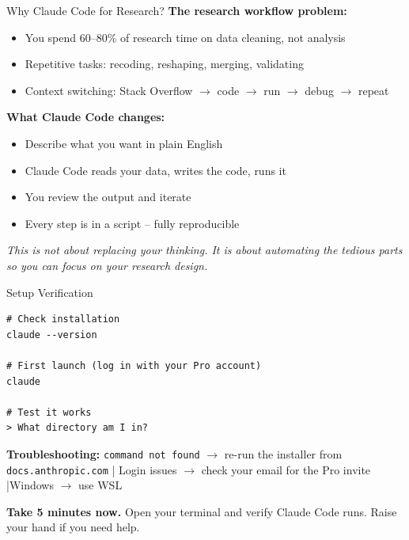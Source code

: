 \begin{frame}{Why Claude Code for Research?}
  \textbf{The research workflow problem:}

  \begin{itemize}
    \item You spend 60--80\% of research time on data cleaning, not analysis
    \item Repetitive tasks: recoding, reshaping, merging, validating
    \item Context switching: Stack Overflow $\to$ code $\to$ run $\to$ debug $\to$ repeat
  \end{itemize}

  \vspace{10pt}

  \textbf{What Claude Code changes:}

  \begin{itemize}
    \item Describe what you want in plain English
    \item Claude Code reads your data, writes the code, runs it
    \item You review the output and iterate
    \item Every step is in a script -- fully reproducible
  \end{itemize}

  \vspace{8pt}

  \textit{This is not about replacing your thinking. It is about automating the tedious parts so you can focus on your research design.}
\end{frame}

\begin{frame}[fragile]{Setup Verification}
\begin{lstlisting}[style=terminal]
# Check installation
claude --version

# First launch (log in with your Pro account)
claude

# Test it works
> What directory am I in?
\end{lstlisting}

  \vspace{4pt}

  \small
  \textbf{Troubleshooting:} \texttt{command not found} $\to$ re-run the installer from \texttt{docs.anthropic.com} \quad|\quad
  Login issues $\to$ check your email for the Pro invite \quad|\quad Windows $\to$ use WSL

  \vspace{4pt}

  \normalsize
  \textbf{\textcolor{usfgreen}{Take 5 minutes now.}} Open your terminal and verify Claude Code runs. Raise your hand if you need help.
\end{frame}

